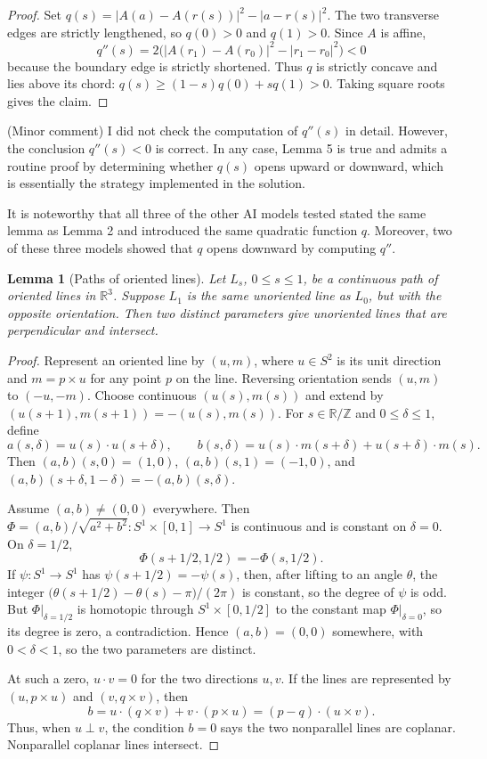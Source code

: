\documentclass[12pt]{article}
\newcommand{\R}{\mathbb R}
\newcommand{\Z}{\mathbb Z}
\theoremstyle{plain}
\newtheorem{lemma}[theorem]{Lemma}
\newcommand{\review}[1]{\begin{reviewbox}#1\end{reviewbox}}
\begin{document}
\begin{proof}
Set \(q(s)=|A(a)-A(r(s))|^2-|a-r(s)|^2\).  The two transverse edges are
strictly lengthened, so \(q(0)>0\) and \(q(1)>0\).  Since \(A\) is affine,
\[
q''(s)=2\bigl(|A(r_1)-A(r_0)|^2-|r_1-r_0|^2\bigr)<0
\]
because the boundary edge is strictly shortened.  Thus \(q\) is strictly
concave and lies above its chord:
\(q(s)\ge(1-s)q(0)+sq(1)>0\).  Taking square roots gives the claim.
\end{proof}

\review{(Minor comment) I did not check the computation of $q''(s)$ in detail. However, the conclusion $q''(s) < 0$ is correct. In any case, Lemma 5 is true and admits a routine proof by determining whether $q(s)$ opens upward or downward, which is essentially the strategy implemented in the solution.}

\review{It is noteworthy that all three of the other AI models tested stated the same lemma as Lemma 2 and introduced the same quadratic function $q$. Moreover, two of these three models showed that $q$ opens downward by  computing $q''$.}

\begin{lemma}[Paths of oriented lines]\label{lem:lines}
Let \(L_s\), \(0\le s\le1\), be a continuous path of oriented lines in
\(\R^3\).  Suppose \(L_1\) is the same unoriented line as \(L_0\), but with the
opposite orientation.  Then two distinct parameters give unoriented lines that
are perpendicular and intersect.
\end{lemma}

\begin{proof}
Represent an oriented line by \((u,m)\), where \(u\in S^2\) is its unit
direction and \(m=p\times u\) for any point \(p\) on the line.  Reversing
orientation sends \((u,m)\) to \((-u,-m)\).  Choose continuous
\((u(s),m(s))\) and extend by \((u(s+1),m(s+1))=-(u(s),m(s))\).  For
\(s\in\R/\Z\) and \(0\le\delta\le1\), define
\[
a(s,\delta)=u(s)\cdot u(s+\delta),\qquad
b(s,\delta)=u(s)\cdot m(s+\delta)+u(s+\delta)\cdot m(s).
\]
Then \((a,b)(s,0)=(1,0)\), \((a,b)(s,1)=(-1,0)\), and
\((a,b)(s+\delta,1-\delta)=-(a,b)(s,\delta)\).

Assume \((a,b)\ne(0,0)\) everywhere.  Then
\(\Phi=(a,b)/\sqrt{a^2+b^2}:S^1\times[0,1]\to S^1\) is continuous and is
constant on \(\delta=0\).  On \(\delta=1/2\),
\[
\Phi(s+1/2,1/2)=-\Phi(s,1/2).
\]
If \(\psi:S^1\to S^1\) has \(\psi(s+1/2)=-\psi(s)\), then, after lifting to an
angle \(\theta\), the integer
\(\bigl(\theta(s+1/2)-\theta(s)-\pi\bigr)/(2\pi)\) is constant, so the degree
of \(\psi\) is odd.  But \(\Phi|_{\delta=1/2}\) is homotopic through
\(S^1\times[0,1/2]\) to the constant map \(\Phi|_{\delta=0}\), so its degree is
zero, a contradiction.  Hence \((a,b)=(0,0)\) somewhere, with
\(0<\delta<1\), so the two parameters are distinct.

At such a zero, \(u\cdot v=0\) for the two directions \(u,v\).  If the lines
are represented by \((u,p\times u)\) and \((v,q\times v)\), then
\[
b=u\cdot(q\times v)+v\cdot(p\times u)=(p-q)\cdot(u\times v).
\]
Thus, when \(u\perp v\), the condition \(b=0\) says the two nonparallel lines
are coplanar.  Nonparallel coplanar lines intersect.
\end{proof}
\end{document}
